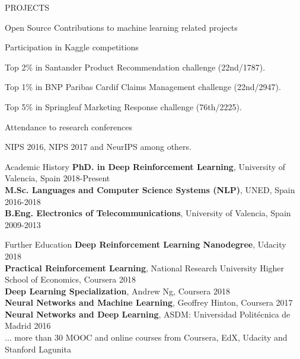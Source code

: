 \documentclass{resume} %
\begin{document}
\begin{rSection}{PROJECTS}
\begin{rSubsection}{Open Source Contributions to machine learning related projects}
\end{rSubsection}

\vspace{-6pt}

\begin{rSubsection}{Participation in Kaggle competitions}
{}{}{}  

\vspace{-3pt}

\item Top 2\% in Santander Product Recommendation challenge (22nd/1787).
\item Top 1\% in BNP Paribas Cardif Claims Management challenge (22nd/2947).
\item Top 5\% in Springleaf Marketing Response challenge (76th/2225).

\end{rSubsection}

\vspace{-6pt}

\begin{rSubsection}{Attendance to research conferences}{}{}{}  

\vspace{-3pt}

 \item NIPS 2016, NIPS 2017 and NeurIPS  among others.

\end{rSubsection}

\end{rSection} 



\begin{rSection}{Academic History}
{\textbf{PhD. in Deep Reinforcement Learning}, University of Valencia, Spain} \hfill {2018-Present}
\\
{\textbf{M.Sc. Languages and Computer Science Systems (NLP)}, UNED, Spain} \hfill {2016-2018}
\\
{\textbf{B.Eng. Electronics of Telecommunications}, University of Valencia, Spain} \hfill {2009-2013}
\end{rSection}

\begin{rSection}{Further Education}
{\textbf{Deep Reinforcement Learning Nanodegree}, Udacity} \hfill {2018}\\
{\textbf{Practical Reinforcement Learning}, National Research University Higher School of Economics, Coursera} \hfill {2018}\\
{\textbf{Deep Learning Specialization}, Andrew Ng, Coursera} \hfill {2018}\\
{\textbf{Neural Networks and Machine Learning}, Geoffrey Hinton, Coursera \hfill {2017}}\\
{\textbf{Neural Networks and Deep Learning}, ASDM: Universidad Politécnica de Madrid \hfill {2016}}\\
{... more than 30 MOOC and online courses from Coursera, EdX, Udacity and Stanford Lagunita}
\end{rSection}
\end{document}
